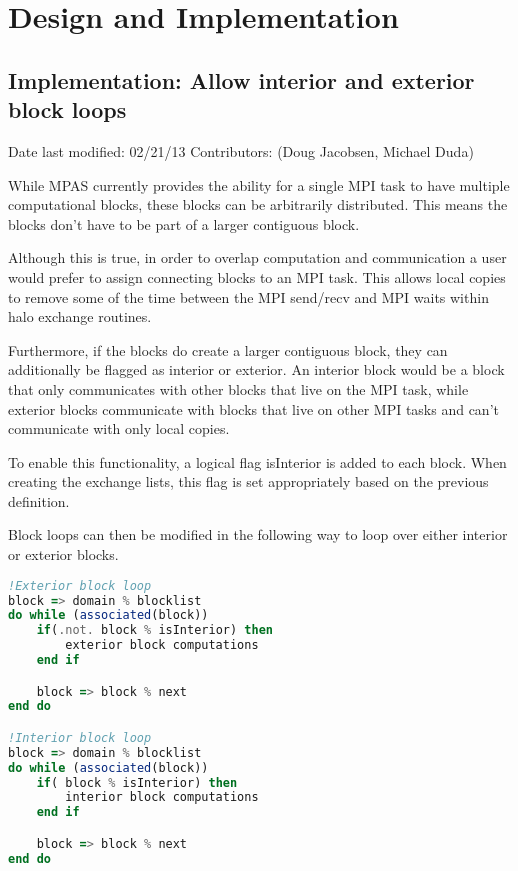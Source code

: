 \documentclass[11pt]{report}
\begin{document}

\chapter{Design and Implementation}

\section{Implementation: Allow interior and exterior block loops}
Date last modified: 02/21/13
Contributors: (Doug Jacobsen, Michael Duda)

While MPAS currently provides the ability for a single MPI task to have
multiple computational blocks, these blocks can be arbitrarily distributed.
This means the blocks don't have to be part of a larger contiguous block.

Although this is true, in order to overlap computation and communication a user
would prefer to assign connecting blocks to an MPI task.  This allows local
copies to remove some of the time between the MPI send/recv and MPI waits
within halo exchange routines.

Furthermore, if the blocks do create a larger contiguous block, they can
additionally be flagged as interior or exterior. An interior block would be a
block that only communicates with other blocks that live on the MPI task, while
exterior blocks communicate with blocks that live on other MPI tasks and can't
communicate with only local copies.

To enable this functionality, a logical flag isInterior is added to each block.
When creating the exchange lists, this flag is set appropriately based on the
previous definition.

Block loops can then be modified in the following way to loop over either
interior or exterior blocks.

\pagebreak

{\tiny
\begin{lstlisting}[language=fortran,escapechar=@,frame=single]
!Exterior block loop
block => domain % blocklist
do while (associated(block))
	if(.not. block % isInterior) then
		exterior block computations
	end if	

	block => block % next
end do

!Interior block loop
block => domain % blocklist
do while (associated(block))
	if( block % isInterior) then
		interior block computations
	end if

	block => block % next
end do
\end{lstlisting}
}
\end{document}

